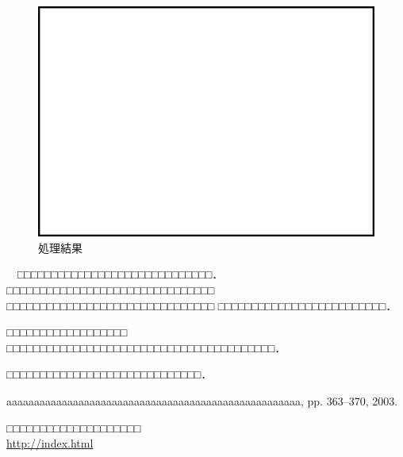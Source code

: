 \begin{figure}[h]
\begin{center}
\includegraphics[scale=1.0]{fig/fig0-1.eps}
  \caption{処理結果}
  \label{fg:1}
\end{center}
\vspace{-6mm}
\end{figure}

\vspace{-2mm}

\def\mamewaku{1}
\begin{mame}
　□□□□□□□□□□□□□□□□□□□□□□□□□□□□□．□□□□□□□□□□□□□□□□□□□□□□□□□□□□□□□
□□□□□□□□□□□□□□□□□□□□□□□□□□□□□□□
□□□□□□□□□□□□□□□□□□□□□□□□□．
\end{mame}



\begin{renshuu}
 \item[\kmaru{1}] □□□□□□□□□□□□□□□□□□
□□□□□□□□□□□□□□□□□□□□□□□□□□□□□□□□□□□□□□□□．
 \item[\kmaru{2}] □□□□□□□□□□□□□□□□□□□□□□□□□□□□□．   
\end{renshuu}


\begin{biblio}
aaaaaaaaaaaaaaaaaaaaaaaaaaaaaaaaaaaaaaaaaaaaaaaaaaaaa,
pp. 363--370, 2003.

□□□□□□□□□□□□□□□□□□□□\\
\url{http://index.html}

\end{biblio}

